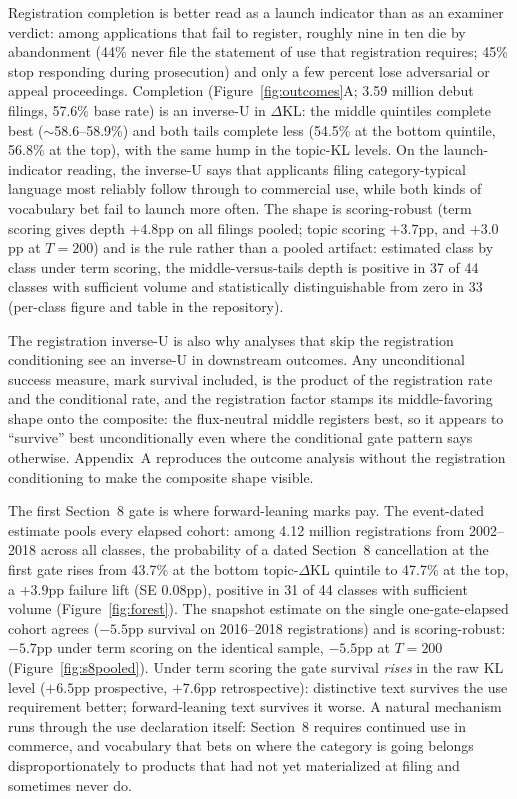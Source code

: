 \documentclass[11pt]{article}
\newcommand{\dkl}{$\Delta$KL}
\begin{document}
Registration completion is better read as a launch indicator than as an
examiner verdict: among applications that fail to register, roughly nine
in ten die by abandonment (44\% never file the statement of use that
registration requires; 45\% stop responding during prosecution) and only
a few percent lose adversarial or appeal proceedings. Completion
(Figure~\ref{fig:outcomes}A; 3.59 million debut filings, 57.6\% base
rate) is an inverse-U in \dkl{}: the middle quintiles complete best
($\sim$58.6--58.9\%) and both tails complete less (54.5\% at the bottom
quintile, 56.8\% at the top), with the same hump in the topic-KL levels.
On the launch-indicator reading, the inverse-U says that applicants
filing category-typical language most reliably follow through to
commercial use, while both kinds of vocabulary bet fail to launch more
often. The shape is scoring-robust (term scoring gives depth $+4.8$pp on
all filings pooled; topic scoring $+3.7$pp, and $+3.0$pp at $T = 200$)
and is the rule rather than a pooled artifact: estimated class by class
under term scoring, the middle-versus-tails depth is positive in 37 of 44
classes with sufficient volume and statistically distinguishable from
zero in 33 (per-class figure and table in the repository).

The registration inverse-U is also why analyses that skip the
registration conditioning see an inverse-U in downstream outcomes.
Any unconditional success measure, mark survival included, is the product
of the registration rate and the conditional rate, and the registration
factor stamps its middle-favoring shape onto the composite: the
flux-neutral middle registers best, so it appears to ``survive'' best
unconditionally even where the conditional gate pattern says otherwise.
Appendix~A reproduces the outcome analysis without the registration
conditioning to make the composite shape visible.

The first Section~8 gate is where forward-leaning marks pay. The
event-dated estimate pools every elapsed cohort: among 4.12 million
registrations from 2002--2018 across all classes, the probability of a
dated Section~8 cancellation at the first gate rises from 43.7\% at the
bottom topic-\dkl{} quintile to 47.7\% at the top, a $+3.9$pp failure
lift (SE 0.08pp), positive in 31 of 44 classes with sufficient volume
(Figure~\ref{fig:forest}). The snapshot estimate on the single
one-gate-elapsed cohort agrees ($-5.5$pp survival on 2016--2018
registrations) and is scoring-robust: $-5.7$pp under term scoring on the
identical sample, $-5.5$pp at $T = 200$ (Figure~\ref{fig:s8pooled}).
Under term scoring the gate survival \emph{rises} in the raw KL level
($+6.5$pp prospective, $+7.6$pp retrospective): distinctive text survives
the use requirement better; forward-leaning text survives it worse. A
natural mechanism runs through the use declaration itself: Section~8
requires continued use in commerce, and vocabulary that bets on where the
category is going belongs disproportionately to products that had not yet
materialized at filing and sometimes never do.
\end{document}
